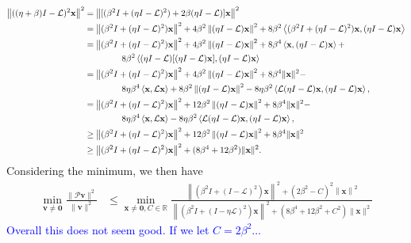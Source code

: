 \documentclass[a4paper,10pt]{article}
\newcommand{\tcb}{\textcolor{blue}}
\begin{document}
\begin{align*}
\left\|((\eta+\beta)I - \mathcal{L})^{2}\mathbf{x}\right\|^2
	& = \left\| [( \beta^2I + (\eta I - \mathcal{L})^{2}) + 2\beta(\eta I - \mathcal{L})]
		\mathbf{x}\right\|^2 \\
& = \left\| ( \beta^2I + (\eta I - \mathcal{L})^{2})\mathbf{x}\right\|^2 +
	4\beta^2\left\|(\eta I - \mathcal{L})\mathbf{x}\right\|^2 +
	8\beta^2 \left\langle ( \beta^2I + (\eta I - \mathcal{L})^{2})\mathbf{x},
		 (\eta I - \mathcal{L})\mathbf{x}\right\rangle \\
& = \left\| ( \beta^2I + (\eta I - \mathcal{L})^{2})\mathbf{x}\right\|^2 +
	4\beta^2\left\|(\eta I - \mathcal{L})\mathbf{x}\right\|^2 +
	8\beta^4 \left\langle \mathbf{x}, (\eta I - \mathcal{L})\mathbf{x}\right\rangle + 
	\\&\hspace{10ex}
	8\beta^2 \left\langle (\eta I - \mathcal{L})[ (\eta I - \mathcal{L})\mathbf{x}] ,
		 (\eta I - \mathcal{L})\mathbf{x}\right\rangle \\
& = \left\| ( \beta^2I + (\eta I - \mathcal{L})^{2})\mathbf{x}\right\|^2 +
	4\beta^2\left\|(\eta I - \mathcal{L})\mathbf{x}\right\|^2 +
	8\beta^4\|\mathbf{x}\|^2 - 
	\\&\hspace{10ex}
	8\eta\beta^4 \left\langle \mathbf{x}, \mathcal{L}\mathbf{x}\right\rangle + 
	8\beta^2 \left\|(\eta I - \mathcal{L})\mathbf{x}\right\|^2 -
	8\eta\beta^2\left\langle \mathcal{L}(\eta I - \mathcal{L})\mathbf{x} ,
		 (\eta I - \mathcal{L})\mathbf{x}\right\rangle, \\
& = \left\| ( \beta^2I + (\eta I - \mathcal{L})^{2})\mathbf{x}\right\|^2 +
	12\beta^2\left\|(\eta I - \mathcal{L})\mathbf{x}\right\|^2 +
	8\beta^4\|\mathbf{x}\|^2 - 
	\\&\hspace{10ex}
	8\eta\beta^4 \left\langle \mathbf{x}, \mathcal{L}\mathbf{x}\right\rangle -
	8\eta\beta^2\left\langle \mathcal{L}(\eta I - \mathcal{L})\mathbf{x} ,
		 (\eta I - \mathcal{L})\mathbf{x}\right\rangle, \\
& \geq \left\| ( \beta^2I + (\eta I - \mathcal{L})^{2})\mathbf{x}\right\|^2 +
	12\beta^2\left\|(\eta I - \mathcal{L})\mathbf{x}\right\|^2 +
	8\beta^4\|\mathbf{x}\|^2 \\
& \geq \left\| ( \beta^2I + (\eta I - \mathcal{L})^{2})\mathbf{x}\right\|^2 +
	(8\beta^4 + 12\beta^2)\|\mathbf{x}\|^2.
\end{align*}
% 
Considering the minimum, we then have
\begin{align*}
\min_{\mathbf{v}\neq\mathbf{0}}	\frac{\|\mathcal{P}\mathbf{v}\|^2}{\|\mathbf{v}\|^2}
	& \leq \min_{\mathbf{x}\neq\mathbf{0}, C\in\mathbb{R}}
	\frac{\left\|(\beta^2I + (I - \mathcal{L})^{2})\mathbf{x}\right\|^2 +
			(2\beta^2 - C)^2\left\|\mathbf{x}\right\|^2}
		{\left\| ( \beta^2I + (I - \eta\mathcal{L})^{2})\mathbf{x}\right\|^2 +
	(8\beta^4 + 12\beta^2 + C^2)\|\mathbf{x}\|^2}
\end{align*}
%
\tcb{
Overall this does not seem good. If we let $C = 2\beta^2$...}
\end{document}
